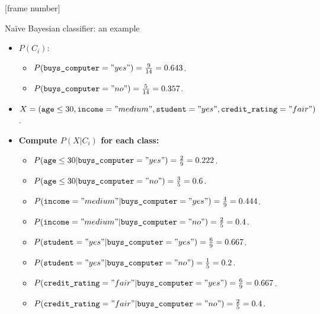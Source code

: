 \documentclass[aspectratio=169,t,table]{beamer}
\begin{document}
  {
    [frame number]
    \begin{frame}{Naïve Bayesian classifier: an example}
      \begin{itemize}
        \item $P(C_i)$:
        \begin{itemize}
          \item $P(\texttt{buys\_computer} = "yes") = \frac{9}{14} = 0.643$.
          \item $P(\texttt{buys\_computer} = "no") = \frac{5}{14} = 0.357$.
        \end{itemize}
        \item $X = (\texttt{age} \leq 30 , \texttt{income} = "medium", \texttt{student} = "yes", \texttt{credit\_rating} = "fair")$.
        \item \textbf{Compute $P(X|C_i)$ for each class:}
        \begin{itemize}
          \item $P(\texttt{age} \leq 30 | \texttt{buys\_computer} = "yes") = \frac{2}{9} = 0.222$.
          \item $P(\texttt{age} \leq 30 | \texttt{buys\_computer} = "no") = \frac{3}{5} = 0.6$.
          \item $P(\texttt{income} = "medium" | \texttt{buys\_computer} = "yes") = \frac{4}{9} = 0.444$.
          \item $P(\texttt{income} = "medium" | \texttt{buys\_computer} = "no") = \frac{2}{5} = 0.4$.
          \item $P(\texttt{student} = "yes" | \texttt{buys\_computer} = "yes") = \frac{6}{9} = 0.667$.
          \item $P(\texttt{student} = "yes" | \texttt{buys\_computer} = "no") = \frac{1}{5} = 0.2$.
          \item $P(\texttt{credit\_rating} = "fair" | \texttt{buys\_computer} = "yes") = \frac{6}{9} = 0.667$.
          \item $P(\texttt{credit\_rating} = "fair" | \texttt{buys\_computer} = "no") = \frac{2}{5} = 0.4$.
        \end{itemize}
      \end{itemize}
    \end{frame}
  }
\end{document}
